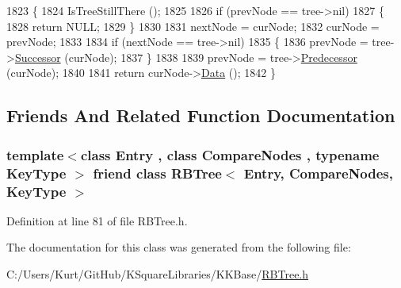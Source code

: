 \begin{DoxyCode}
1823 \{
1824   IsTreeStillThere ();
1825 
1826   \textcolor{keywordflow}{if}  (prevNode == tree->nil)
1827   \{
1828     \textcolor{keywordflow}{return} NULL;
1829   \}
1830 
1831   nextNode = curNode;
1832   curNode = prevNode;
1833 
1834   \textcolor{keywordflow}{if}  (nextNode == tree->nil)
1835   \{
1836     prevNode = tree->\hyperlink{class_k_k_b_1_1_r_b_tree_ab1d21c68ef6c6a58b0317f9986e66804}{Successor} (curNode);
1837   \}
1838 
1839   prevNode = tree->\hyperlink{class_k_k_b_1_1_r_b_tree_a3a5c20c3087b62c7a68a48878eb8fe82}{Predecessor} (curNode);
1840   
1841   \textcolor{keywordflow}{return}  curNode->\hyperlink{class_k_k_b_1_1_r_bnode_a9d29b22149e67b0a1949dbf7e2f2c91b}{Data} ();  
1842 \}
\end{DoxyCode}


\subsection{Friends And Related Function Documentation}
\subsubsection[{\texorpdfstring{R\+B\+Tree$<$ Entry, Compare\+Nodes, Key\+Type $>$}{RBTree< Entry, CompareNodes, KeyType >}}]{\setlength{\rightskip}{0pt plus 5cm}template$<$class Entry , class Compare\+Nodes , typename Key\+Type $>$ friend class {\bf R\+B\+Tree}$<$ Entry, Compare\+Nodes, Key\+Type $>$\hspace{0.3cm}{\ttfamily [friend]}}\hypertarget{class_k_k_b_1_1_iterator_aa42becdc72b54f00ba2c0f0e3c2f5717}{}\label{class_k_k_b_1_1_iterator_aa42becdc72b54f00ba2c0f0e3c2f5717}


Definition at line 81 of file R\+B\+Tree.\+h.



The documentation for this class was generated from the following file\+:\begin{DoxyCompactItemize}
\item 
C\+:/\+Users/\+Kurt/\+Git\+Hub/\+K\+Square\+Libraries/\+K\+K\+Base/\hyperlink{_r_b_tree_8h}{R\+B\+Tree.\+h}\end{DoxyCompactItemize}
